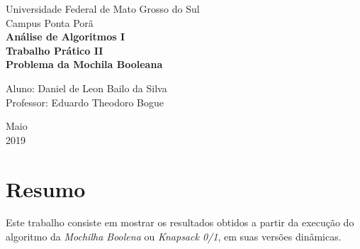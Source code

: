 \documentclass[a4paper, 12pt]{article}
\begin{document}
\begin{titlepage}
    \begin{center}
		\LARGE{Universidade Federal de Mato Grosso do Sul}\\
		\vspace{5pt}
        \large{Campus Ponta Porã}\\ 
        \large{{\textbf{Análise de Algoritmos I}}}\\ 
        \vspace{15pt}
        \vspace{95pt}
        \textbf{\large{Trabalho Prático II}}\\
        \vspace{15pt}
        \textbf{\LARGE{Problema da Mochila Booleana}}\\
        \vspace{3,5cm}
    \end{center}
    
    \begin{flushleft}
        \begin{tabbing}
            Aluno: Daniel de Leon Bailo da Silva\\            
            Professor: Eduardo Theodoro Bogue\\
    \end{tabbing}
 \end{flushleft}
    \vspace{1cm}
    
    \begin{center}
        \vspace{\fill}
            Maio\\
         2019
            \end{center}
\end{titlepage}

\clearpage
\tableofcontents
\thispagestyle{empty}
\clearpage


\section*{Resumo}
\label{sec:resumo}
Este trabalho consiste em mostrar os resultados obtidos a partir da execução
do algoritmo da {\it Mochilha Boolena} ou {\it Knapsack 0/1}, em suas versões dinâmicas.
\end{document}
